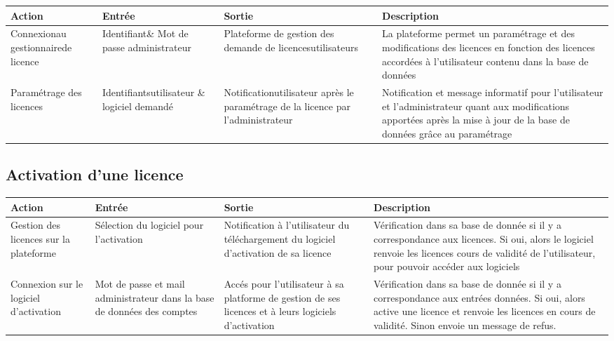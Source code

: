 \begin{table}[!ht] %
	\begin{tabular}{ | m{3cm} | m{3cm} | m{3cm} | m{6cm} | } 
		\hline
		\textbf{Action} & \textbf{Entrée} & \textbf{Sortie} & \textbf{Description} \\
		\hline
			Connexion\newline au gestionnaire\newline de licence & Identifiant\newline \& Mot de passe administrateur & Plateforme de gestion  des demande de licences\newline utilisateurs & La plateforme permet un paramétrage et des modifications des licences en fonction des licences accordées à l'utilisateur contenu dans la base de données\\
		\hline
			Paramétrage \newline des licences& Identifiants\newline utilisateur \& \newline logiciel demandé & Notification\newline utilisateur après le paramétrage de la licence par l'administrateur & Notification et message informatif pour l'utilisateur et l'administrateur quant aux modifications apportées après la mise à jour de la base de données grâce au paramétrage\\
		\hline	    
	\end{tabular}
\end{table}

\subsection{Activation d'une licence}

\begin{table}[!ht] %
	\begin{tabular}{ | m{3cm} | m{3cm} | m{3cm} | m{6cm} | } 
		\hline
		\textbf{Action} & \textbf{Entrée} & \textbf{Sortie} & \textbf{Description} \\
		\hline
			Gestion des licences sur la plateforme & Sélection du logiciel pour l'activation & Notification à l'utilisateur du téléchargement du logiciel d'activation de sa licence & Vérification dans sa base de donnée si il y a correspondance aux licences. Si oui, alors le logiciel renvoie les licences cours de validité de l'utilisateur, pour pouvoir accéder aux logiciels \\ 
		\hline
			Connexion sur \newline le logiciel \newline d'activation &  Mot de passe et mail administrateur dans la base de données des comptes & Accés pour l'utilisateur à sa platforme de gestion de ses licences et à leurs logiciels d'activation & Vérification dans sa base de donnée si il y a correspondance aux entrées données. Si oui, alors active une licence et renvoie les licences en cours de validité. Sinon envoie un message de refus. \\ 
		\hline
	\end{tabular}
\end{table}
